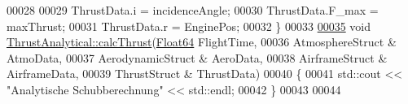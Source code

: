 \begin{DoxyCode}
00028 
00029     ThrustData.i = incidenceAngle;
00030     ThrustData.F\_max = maxThrust;
00031     ThrustData.r = EnginePos;
00032 \}
00033 
\hyperlink{group___engine_a521b775b57dc2324f09496efb8b12452}{00035} \textcolor{keywordtype}{void} \hyperlink{group___engine_a521b775b57dc2324f09496efb8b12452}{ThrustAnalytical::calcThrust}(\hyperlink{group___tools_ga3f1431cb9f76da10f59246d1d743dc2c}{Float64} FlightTime,
00036                                   AtmosphereStruct & AtmoData,
00037                                   AerodynamicStruct & AeroData,
00038                                   AirframeStruct & AirframeData,
00039                                   ThrustStruct & ThrustData)
00040 \{
00041     std::cout << \textcolor{stringliteral}{"Analytische Schubberechnung"} << std::endl;
00042 \}
00043 
00044 
\end{DoxyCode}
